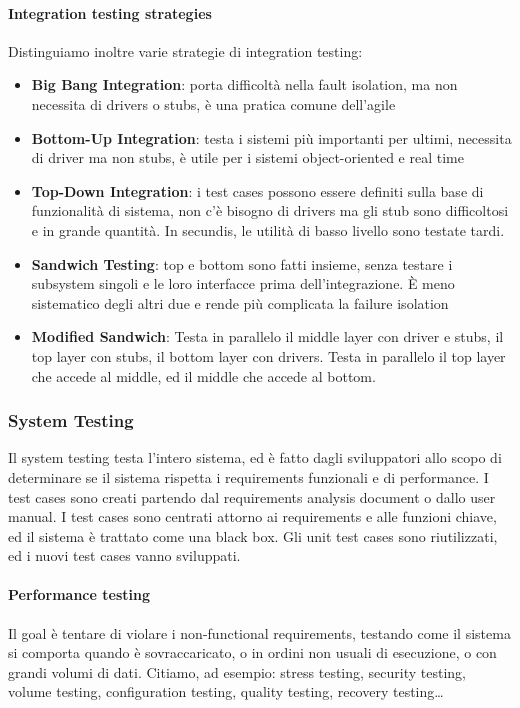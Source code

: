 \documentclass[11pt]{article}
\begin{document}
\paragraph{Integration testing strategies}
Distinguiamo inoltre varie strategie di integration testing:
\begin{itemize}
    \item \textbf{Big Bang Integration}: porta difficoltà nella fault isolation, ma non necessita di drivers o stubs, è una pratica comune dell'agile
    \item \textbf{Bottom-Up Integration}: testa i sistemi più importanti per ultimi, necessita di driver ma non stubs, è utile per i sistemi object-oriented e real time 
    \item \textbf{Top-Down Integration}: i test cases possono essere definiti sulla base di funzionalità di sistema, non c'è bisogno di drivers ma gli stub sono difficoltosi e in grande quantità. In secundis, le utilità di basso livello sono testate tardi.
    \item \textbf{Sandwich Testing}: top e bottom sono fatti insieme, senza testare i subsystem singoli e le loro interfacce prima dell'integrazione. È meno sistematico degli altri due e rende più complicata la failure isolation
    \item \textbf{Modified Sandwich}: Testa in parallelo il middle layer con driver e stubs, il top layer con stubs, il bottom layer con drivers. Testa in parallelo il top layer che accede al middle, ed il middle che accede al bottom. 
\end{itemize}

\subsubsection{System Testing}
Il system testing testa l'intero sistema, ed è fatto dagli sviluppatori allo scopo di determinare se il sistema rispetta i requirements funzionali e di performance. I test cases sono creati partendo dal requirements analysis document o dallo user manual. I test cases sono centrati attorno ai requirements e alle funzioni chiave, ed il sistema è trattato come una black box. Gli unit test cases sono riutilizzati, ed i nuovi test cases vanno sviluppati. 
\paragraph{Performance testing} Il goal è tentare di violare i non-functional requirements, testando come il sistema si comporta quando è sovraccaricato, o in ordini non usuali di esecuzione, o con grandi volumi di dati. Citiamo, ad esempio: stress testing, security testing, volume testing, configuration testing, quality testing, recovery testing\dots
\end{document}
